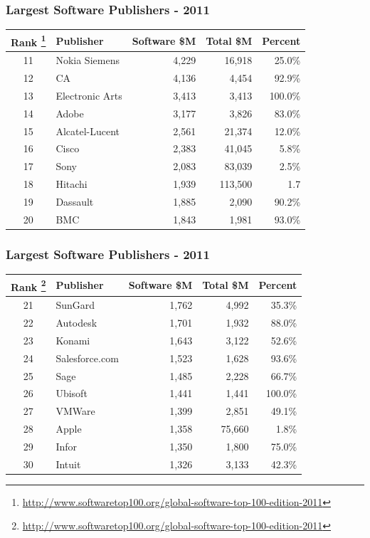 \documentclass[18pt]{beamer}
\begin{document}
{
\begin{frame}
\frametitle{Largest Software Publishers - 2011}

\begin{center}
\begin{tabular}{clrrr}
\hline
  \textbf{Rank
\footnote{
\url{http://www.softwaretop100.org/global-software-top-100-edition-2011}}
} &\textbf{Publisher} & \textbf{Software \$M} & \textbf{Total \$M} & \textbf{Percent} \\
\hline
\hline
11 & Nokia Siemens & 4,229 & 16,918 & 25.0\% \\
12 & CA & 4,136 & 4,454 & 92.9\% \\
13 & Electronic Arts & 3,413 & 3,413 & 100.0\% \\
14 & Adobe & 3,177 & 3,826 & 83.0\% \\
15 & Alcatel-Lucent & 2,561 & 21,374 & 12.0\% \\
16 & Cisco & 2,383 & 41,045 & 5.8\% \\
17 & Sony & 2,083 & 83,039 & 2.5\% \\
18 & Hitachi & 1,939 & 113,500 & 1.7\\%
19 & Dassault & 1,885 & 2,090 & 90.2\% \\
20 & BMC & 1,843 & 1,981 & 93.0\% \\
\end{tabular}

\end{center}
\end{frame}
}




{
\begin{frame}
\frametitle{Largest Software Publishers - 2011}

\begin{center}
\begin{tabular}{clrrr}
\hline
  \textbf{Rank
\footnote{
\url{http://www.softwaretop100.org/global-software-top-100-edition-2011}}
} &\textbf{Publisher} & \textbf{Software \$M} & \textbf{Total \$M} & \textbf{Percent} \\
\hline
\hline
21 & SunGard & 1,762 & 4,992 & 35.3\%  \\
22 & Autodesk & 1,701 & 1,932 & 88.0\%  \\
23 & Konami & 1,643 & 3,122 & 52.6\%   \\
24 & Salesforce.com & 1,523 & 1,628 & 93.6\% \\
25 & Sage & 1,485 & 2,228 & 66.7\%  \\
26 & Ubisoft & 1,441 & 1,441 & 100.0\%  \\
27 & VMWare & 1,399 & 2,851 & 49.1\%  \\
28 & Apple & 1,358 & 75,660 & 1.8\%  \\
29 & Infor & 1,350 & 1,800 & 75.0\%  \\
30 & Intuit & 1,326 & 3,133 & 42.3\%  \\
\end{tabular}

\end{center}
\end{frame}
}
\end{document}
